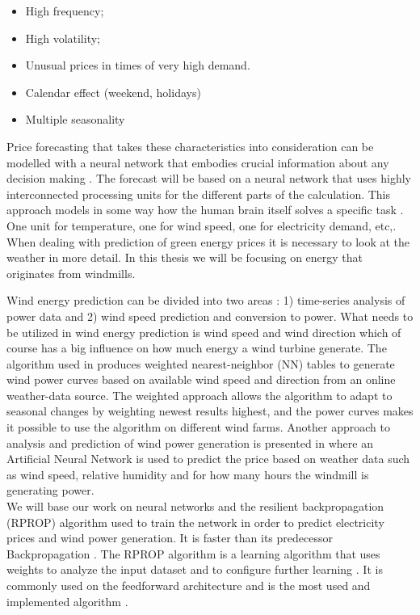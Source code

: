 \documentclass[twoside,11pt,openright]{report}
\begin{document}
\begin{itemize}
\item High frequency;
\item High volatility;
\item Unusual prices in times of very high demand.
\item Calendar effect (weekend, holidays)
\item Multiple seasonality
\end{itemize}
Price forecasting that takes these characteristics into consideration can be modelled with a neural network that embodies crucial information about any decision making \cite{1}. The forecast will be based on a neural network that uses highly interconnected processing units for the different parts of the calculation. This approach models in some way how the human brain itself solves a specific task \cite{1}\cite{2}. One unit for temperature, one for wind speed, one for electricity demand, etc,.\cite{3} 
\\[0.5cm] 
When dealing with prediction of green energy prices it is necessary to look at the weather in more detail. In this thesis we will be focusing on energy that originates from windmills. 

Wind energy prediction can be divided into two areas \cite{5}: 1) time-series analysis of power data and 2) wind speed prediction and conversion to power. What needs to be utilized in wind energy prediction is wind speed and wind direction which of course has a big influence on how much energy a wind turbine generate. The algorithm used in \cite{5} produces weighted nearest-neighbor (NN) tables to generate wind power curves based on available wind speed and direction from an online weather-data source. The weighted approach allows the algorithm to adapt to seasonal changes by weighting newest results highest, and the power curves makes it possible to use the algorithm on different wind farms. Another approach to analysis and prediction of wind power generation is presented in \cite{WindPowerGenerationUsingANN} where an Artificial Neural Network is used to predict the price based on weather data such as wind speed, relative humidity and for how many hours the windmill is generating power. 
\\[0.5cm]
We will base our work on neural networks and the resilient backpropagation (RPROP) algorithm used to train the network in order to predict electricity prices and wind power generation. It is faster than its predecessor Backpropagation \cite{8,15}.  The RPROP algorithm is a learning algorithm that uses weights to analyze the input dataset and to configure further learning \cite{17}. It is commonly used on the feedforward architecture and is the most used and implemented algorithm \cite{14,17}.
\end{document}
